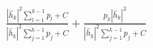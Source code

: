 \documentclass[preview]{standalone}
\begin{document}
\begin{align*}
\frac{\left|{\hat{h}_k}\right|^2\sum_{l=1}^{k-1}p_l+ C}{\left|{\hat{h}_k}\right|^2\sum_{j=1}^{k-1}p_j+ C} + \frac{p_k\left|{\hat{h}_k}\right|^2}{\left|{\hat{h}_k}\right|^2\sum_{j=1}^{k-1}p_j+ C}
\end{align*}
\end{document}
